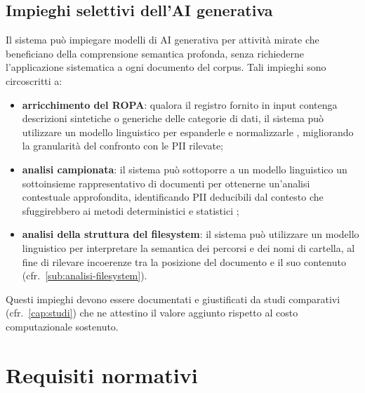 \subsection{Impieghi selettivi dell'AI generativa}
\label{sub:ai-selettiva}
Il sistema può impiegare modelli di AI generativa per attività mirate che beneficiano della comprensione semantica profonda, senza richiederne l'applicazione sistematica a ogni documento del corpus. Tali impieghi sono circoscritti a:
\begin{itemize}
	\item \textbf{arricchimento del ROPA}: qualora il registro fornito in input contenga descrizioni sintetiche o generiche delle categorie di dati, il sistema può utilizzare un modello linguistico per espanderle e normalizzarle \cite{yangExploringApplicationLarge2023}, migliorando la granularità del confronto con le PII rilevate;
	\item \textbf{analisi campionata}: il sistema può sottoporre a un modello linguistico un sottoinsieme rappresentativo di documenti per ottenerne un'analisi contestuale approfondita, identificando PII deducibili dal contesto che sfuggirebbero ai metodi deterministici e statistici \cite{yangExploringApplicationLarge2023};
	\item \textbf{analisi della struttura del filesystem}: il sistema può utilizzare un modello linguistico per interpretare la semantica dei percorsi e dei nomi di cartella, al fine di rilevare incoerenze tra la posizione del documento e il suo contenuto (cfr.~\ref{sub:analisi-filesystem}).
\end{itemize} \medskip

Questi impieghi devono essere documentati e giustificati da studi comparativi (cfr.~\ref{cap:studi}) che ne attestino il valore aggiunto rispetto al costo computazionale sostenuto.


\section{Requisiti normativi}
\label{sec:requisiti-normativi}

